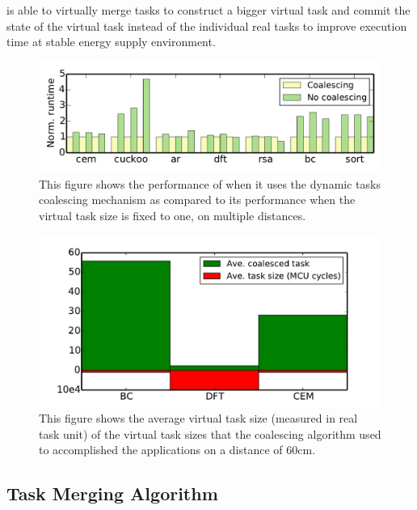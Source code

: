 \sys is able to virtually merge tasks to construct a bigger virtual task and commit the state of the virtual task instead of the individual real tasks to improve execution time at stable energy supply environment. 

\begin{figure}
	\centering
	\includegraphics[width=\columnwidth]{figures/coalescing}
	\caption{This figure shows the performance of \sys when it uses the dynamic tasks coalescing mechanism as compared to its performance when the virtual task size is fixed to one, on multiple distances. }
	\label{fig:coalescing}
\end{figure}

\begin{figure}
	\centering
	\includegraphics[width=\columnwidth]{figures/averageVirtualTaskSize}
	\caption{ This figure shows the average virtual task size (measured in real task unit) of the virtual task sizes that the coalescing algorithm used to accomplished the applications on a distance of 60cm. }
	\label{fig:aveVirtuTaskSize}
\end{figure}



\subsection{Task Merging Algorithm}

